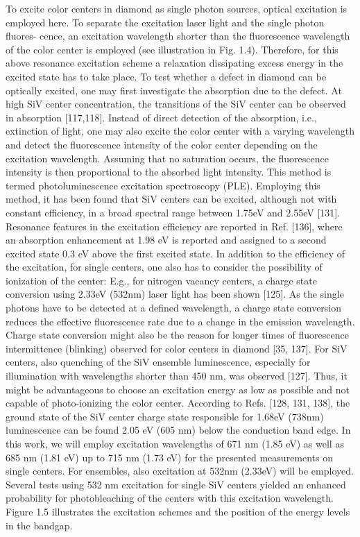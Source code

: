       To excite color centers in diamond as single photon sources, optical excitation is employed here. To separate the excitation laser light and the single photon fluores- cence, an excitation wavelength shorter than the fluorescence wavelength of the color center is employed (see illustration in Fig. 1.4). Therefore, for this above resonance excitation scheme a relaxation dissipating excess energy in the excited state has to take place.
      To test whether a defect in diamond can be optically excited, one may first investigate the absorption due to the defect. At high SiV center concentration, the transitions of the SiV center can be observed in absorption [117,118]. Instead of direct detection of the absorption, i.e., extinction of light, one may also excite the color center with a varying wavelength and detect the fluorescence intensity of the color center depending on the excitation wavelength. Assuming that no saturation occurs, the fluorescence intensity is then proportional to the absorbed light intensity. This method is termed photoluminescence excitation spectroscopy (PLE). Employing this method, it has been found that SiV centers can be excited, although not with constant efficiency, in a broad spectral range between 1.75eV and 2.55eV [131]. Resonance features in the excitation efficiency are reported in Ref. [136], where an absorption enhancement at 1.98 eV is reported and assigned to a second excited state 0.3 eV above the first excited state.
      In addition to the efficiency of the excitation, for single centers, one also has to consider the possibility of ionization of the center: E.g., for nitrogen vacancy centers, a charge state conversion using 2.33eV (532nm) laser light has been shown [125]. As the single photons have to be detected at a defined wavelength, a charge state conversion reduces the effective fluorescence rate due to a change in the emission wavelength. Charge state conversion might also be the reason for longer times of fluorescence intermittence (blinking) observed for color centers in diamond [35, 137]. For SiV centers, also quenching of the SiV ensemble luminescence, especially for illumination with wavelengths shorter than 450 nm, was observed [127]. Thus, it might be advantageous to choose an excitation energy as low as possible and not capable of photo-ionizing the color center. According to Refs. [128, 131, 138], the ground state of the SiV center charge state responsible for 1.68eV (738nm) luminescence can be found 2.05 eV (605 nm) below the conduction band edge. In this work, we will employ excitation wavelengths of 671 nm (1.85 eV) as well as 685 nm (1.81 eV) up to 715 nm (1.73 eV) for the presented measurements on single centers. For ensembles, also excitation at 532nm (2.33eV) will be employed. Several tests using 532 nm excitation for single SiV centers yielded an enhanced probability for photobleaching of the centers with this excitation wavelength. Figure 1.5 illustrates the excitation schemes and the position of the energy levels in the bandgap.

